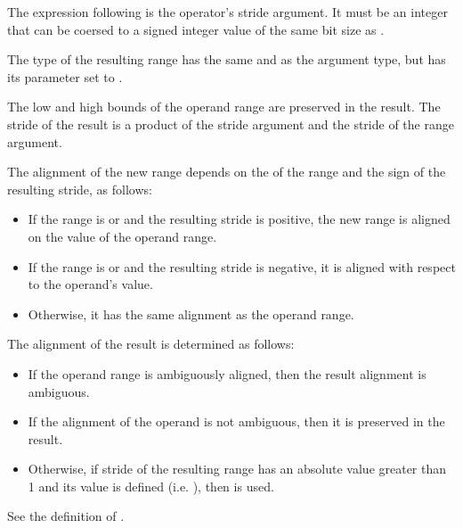 The expression following  is the  operator's stride argument.
It must be an integer that can be coersed to a signed integer value of the same
bit size as .  

The type of the resulting range has the same
 and  as the
argument type, but has its  parameter set to .

The low and high bounds of the operand range are preserved in the result.
The stride of the result is a product of the stride argument and
the stride of the range argument.

The alignment of the new range depends on the  of the range
and the sign of the resulting stride, as follows:
\begin{itemize}
\item If the range is  or  and  the resulting stride is positive, the new range is aligned on
the  value of the operand range.  
\item If the range
is  or  and  the resulting stride is
negative, it is aligned with respect to the operand's  value.
\item Otherwise, it has the same alignment as the operand range.
\end{itemize}

The alignment of the result is determined as follows:
\begin{itemize}
\item If the operand range is ambiguously aligned, then the result alignment is ambiguous.
\item If the alignment of the operand is not ambiguous, then
it is preserved in the result.
\item Otherwise, if stride of the resulting range has an absolute value greater
than 1 and its  value is defined (i.e.
), then  is used.
\end{itemize}
See the definition of .

